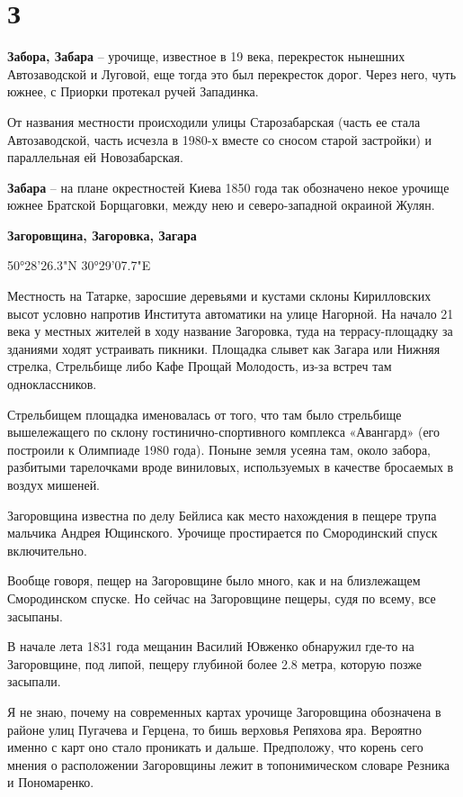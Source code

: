 \chapter*{З}

\textbf{Забора, Забара} – урочище, известное в 19 века, перекресток нынешних Автозаводской и Луговой, еще тогда это был перекресток дорог. Через него, чуть южнее, с Приорки протекал ручей Западинка.

От названия местности происходили улицы Старозабарская (часть ее стала Автозаводской, часть исчезла в 1980-х вместе со сносом старой застройки) и параллельная ей Новозабарская.\\

\medskip

\textbf{Забара} – на плане окрестностей Киева 1850 года так обозначено некое урочище южнее Братской Борщаговки, между нею и северо-западной окраиной Жулян.\\

\medskip

\textbf{Загоровщина, Загоровка, Загара}

50°28'26.3"N 30°29'07.7"E

Местность на Татарке, заросшие деревьями и кустами склоны Кирилловских высот условно напротив Института автоматики на улице Нагорной. На начало 21 века у местных жителей в ходу название Загоровка, туда на террасу-площадку за зданиями ходят устраивать пикники. Площадка слывет как Загара или Нижняя стрелка, Стрельбище либо Кафе Прощай Молодость, из-за встреч там одноклассников.

Стрельбищем площадка именовалась от того, что там было стрельбище вышележащего по склону гостинично-спортивного комплекса «Авангард» (его построили к Олимпиаде 1980 года). Поныне земля усеяна там, около забора, разбитыми тарелочками вроде виниловых, используемых в качестве бросаемых в воздух мишеней.

Загоровщина известна по делу Бейлиса как место нахождения в пещере трупа мальчика Андрея Ющинского. Урочище простирается по Смородинский спуск включительно.

Вообще говоря, пещер на Загоровщине было много, как и на близлежащем Смородинском спуске. Но сейчас на Загоровщине пещеры, судя по всему, все засыпаны.

В начале лета 1831 года мещанин Василий Ювженко обнаружил где-то на Загоровщине, под липой, пещеру глубиной более 2.8 метра, которую позже засыпали. 

Я не знаю, почему на современных картах урочище Загоровщина обозначена в районе улиц Пугачева и Герцена, то бишь верховья Репяхова яра. Вероятно именно с карт оно стало проникать и дальше. Предположу, что корень сего мнения о расположении Загоровщины лежит в топонимическом словаре Резника и Пономаренко.\\

